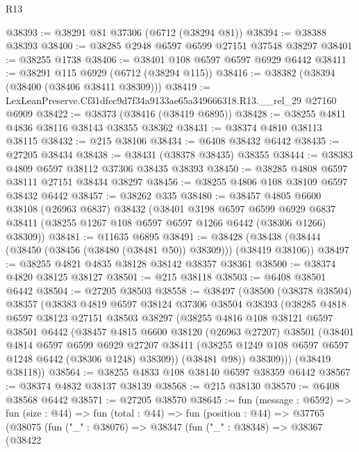 \begin{lexlean}{R13}
\begin{coremodule}
@38393 := @38291 @81 @37306 (@6712 (@38294 @81))
@38394 := @38388 @38393
@38400 := @38285 @2948 @6597 @6599 @27151 @37548 @38297
@38401 := @38255 @1738
@38406 := @38401 @108 @6597 @6597 @6929 @6442
@38411 := @38291 @115 @6929 (@6712 (@38294 @115))
@38416 := @38382 (@38394 (@38400 (@38406 @38411 @38309)))
@38419 := LexLeanPreserve.Cf31dfec9d7f34a9133ae65a349666318.R13.__rel_29 @27160 @6909
@38422 := @38373 (@38416 (@38419 @6895))
@38428 := @38255 @4811 @4836 @38116 @38143 @38355 @38362
@38431 := @38374 @4810 @38113 @38115
@38432 := @215 @38106
@38434 := @6408 @38432 @6442
@38435 := @27205 @38434
@38438 := @38431 (@38378 @38435) @38355
@38444 := @38383 @4809 @6597 @38112 @37306 @38435 @38393
@38450 := @38285 @4808 @6597 @38111 @27151 @38434 @38297
@38456 := @38255 @4806 @108 @38109 @6597 @38432 @6442
@38457 := @38262 @335
@38480 := @38457
    @4805
    @6600
    @38108
    (@26963 @6837)
    @38432
    (@38401
      @3198
      @6597
      @6599
      @6929
      @6837
      @38411
      (@38255 @1267 @108 @6597 @6597 @1266 @6442 (@38306 @1266) @38309))
@38481 := @11635 @6895
@38491 := @38428 (@38438 (@38444 (@38450 (@38456 (@38480 (@38481 @50)) @38309))) (@38419 @38106))
@38497 := @38255 @4821 @4835 @38128 @38142 @38357 @38361
@38500 := @38374 @4820 @38125 @38127
@38501 := @215 @38118
@38503 := @6408 @38501 @6442
@38504 := @27205 @38503
@38558 := @38497
    (@38500
      (@38378 @38504)
      @38357
      (@38383
        @4819
        @6597
        @38124
        @37306
        @38504
        @38393
        (@38285
          @4818
          @6597
          @38123
          @27151
          @38503
          @38297
          (@38255
            @4816
            @108
            @38121
            @6597
            @38501
            @6442
            (@38457
              @4815
              @6600
              @38120
              (@26963 @27207)
              @38501
              (@38401
                @4814
                @6597
                @6599
                @6929
                @27207
                @38411
                (@38255 @1249 @108 @6597 @6597 @1248 @6442 (@38306 @1248) @38309))
              (@38481 @98))
            @38309)))
      (@38419 @38118))
@38564 := @38255 @4833 @108 @38140 @6597 @38359 @6442
@38567 := @38374 @4832 @38137 @38139
@38568 := @215 @38130
@38570 := @6408 @38568 @6442
@38571 := @27205 @38570
@38645 := fun (message : @6592) =>
  fun (size : @44) =>
  fun (total : @44) =>
  fun (position : @44) =>
  @37765
    (@38075
      (fun ("_" : @38076) =>
      @38347
        (fun ("_" : @38348) =>
        @38367
          (@38422

\end{coremodule}
\end{lexlean}
